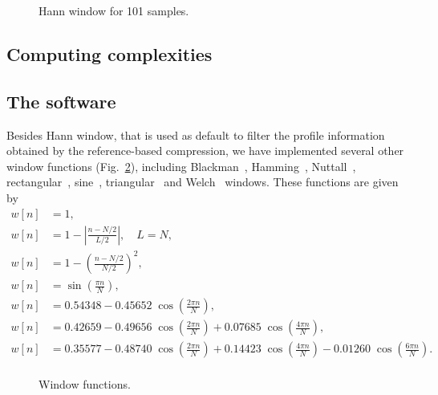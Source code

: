\begin{figure}[!h]
\centering
\caption{Hann window for 101 samples.}
\label{fig.hann}
\end{figure}

\subsection{Computing complexities}

\subsection{The software}
\label{subsec.software}

Besides Hann window, that is used as default to filter the profile information obtained by the reference-based compression, we have implemented several other window functions (Fig.~\ref{fig.filters}), including Blackman~\cite{blackman1959particular}, Hamming~\cite{tukey1949measuring}, Nuttall~\cite{nuttall1981some}, rectangular~\cite{oppenheim1999discrete}, sine~\cite{harris1978use}, triangular~\cite{bartlett1950periodogram} and Welch~\cite{welch1967use} windows. These functions are given by
\begin{align}
  w[n] &= 1,
  \tag*{(rectangular)} \\
  w[n] &= 1-\left|\tfrac {n-N/2}{L/2}\right|, \quad L=N,
  \tag*{(triangular/Bartlett)} \\
  w[n] &= 1-\left(\tfrac {n-N/2}{N/2}\right)^{2},
  \tag*{(Welch)} \\
  w[n] &= \sin \left(\tfrac {\pi n}{N}\right),
  \tag*{(sine)} \\
  w[n] &= 0.54348-0.45652\;\cos \left(\tfrac {2\pi n}{N}\right),
  \tag*{(Hamming)} \\
  w[n] &= 0.42659-0.49656\;\cos \left(\tfrac {2\pi n}{N}\right)+0.07685\;\cos \left(\tfrac {4\pi n}{N}\right),
  \tag*{(Blackman)} \\
  w[n] &= 0.35577-0.48740\;\cos \left(\tfrac {2\pi n}{N}\right)+0.14423\;\cos \left(\tfrac {4\pi n}{N}\right)-0.01260\;\cos \left(\tfrac {6\pi n}{N}\right).
  \tag*{(Nuttall)} \\
\end{align}

\begin{figure}[!h]
\centering
\caption{Window functions.}
\label{fig.filters}
\end{figure}